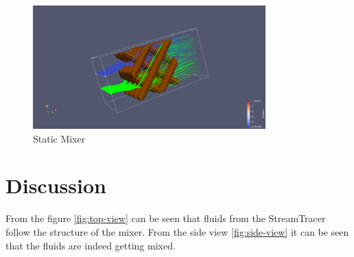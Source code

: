 \documentclass{article}
\begin{document}
\begin{figure}[H]
    \centering
    \includegraphics[width=0.8\textwidth]{final.png}
    \caption{Static Mixer}
    \label{fig:static_mixer}
\end{figure}

\section{Discussion}
From the figure \ref{fig:top-view} can be seen that fluids from the StreamTracer follow the structure of the mixer.
From the side view \ref{fig:side-view} it can be seen that the fluids are indeed getting mixed.
\end{document}
